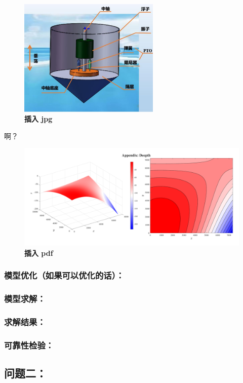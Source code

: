 \documentclass[zihao=-4, UTF8]{article}		%
\theoremstyle{MyLineTheoremStyle} %
\theoremstyle{MyBlockTheoremStyle} %
\theoremstyle{MySubsubsectionStyle} %
\begin{document}
\begin{figure}[H]
  \centering
  \includegraphics[width=0.6\textwidth]{assets/波浪能装置示意图.jpg}
  \caption{\textbf{插入 jpg}}\label{插入 jpg}
\end{figure}
啊？
\begin{figure}[H]
  \centering
  \includegraphics[width=\textwidth]{assets/2024-08-15_02-04-29.pdf}
  \caption{\textbf{插入 pdf}}\label{插入 pdf}
\end{figure}

\subsubsection{模型优化（如果可以优化的话）：}
\subsubsection{模型求解：}
\subsubsection{求解结果：}
\subsubsection{可靠性检验：}

\subsection{问题二：}
\end{document}
